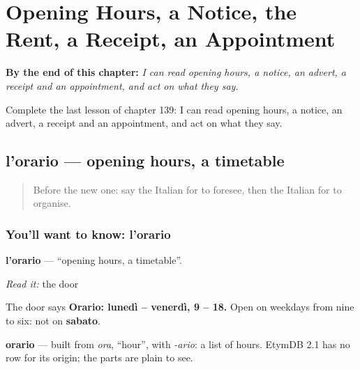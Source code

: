 
\chapter{Opening Hours, a Notice, the Rent, a Receipt, an Appointment}
\label{ch:it-opening-hours-a-notice-the-rent-a-receipt-an-appointment}

\begin{chapteropening}
\textbf{By the end of this chapter:} \emph{I can read opening hours, a notice, an advert, a receipt and an appointment, and act on what they say.}

Complete the last lesson of chapter 139: I can read opening hours, a notice, an advert, a receipt and an appointment, and act on what they say.
\end{chapteropening}

\section[l'orario]{l'orario — opening hours, a timetable}

\label{lesson:IT-C139-lorario}



\begin{quote}
Before the new one: say the Italian for to foresee, then the Italian for to organise.
\end{quote}

\subsection*{You'll want to know: l'orario}
\textbf{l'orario} — \textquotedblleft{}opening hours, a timetable\textquotedblright{}.

\emph{Read it:} the door

The door says \textbf{Orario: lunedì – venerdì, 9 – 18.} Open on weekdays from nine to six: not on \textbf{sabato}.

\begin{cousinweb}
\textbf{orario} — built from \emph{ora}, \textquotedblleft{}hour\textquotedblright{}, with \emph{-ario}: a list of hours. EtymDB 2.1 has no row for its origin; the parts are plain to see.
\end{cousinweb}

